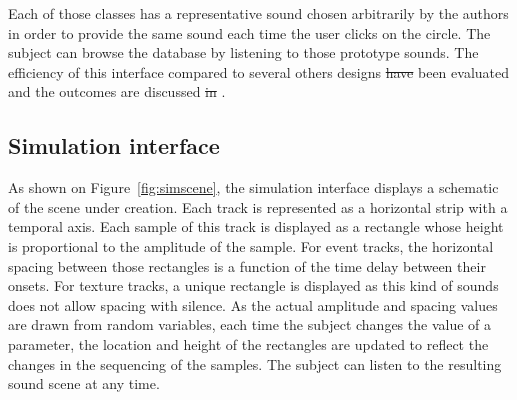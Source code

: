 \documentclass[12pt]{elsarticle}
\newcommand{\cf}{cf.}
\providecommand{\DIFadd}[1]{{\protect\color{blue}\uwave{#1}}} %
\providecommand{\DIFdel}[1]{{\protect\color{red}\sout{#1}}}                      %
\providecommand{\DIFaddbegin}{} %
\providecommand{\DIFaddend}{} %
\providecommand{\DIFdelbegin}{} %
\providecommand{\DIFdelend}{} %
\begin{document}

Each of those classes has a representative sound chosen arbitrarily by the authors in order to provide the same sound each time the user clicks on the circle. The subject can browse the database by listening to those prototype sounds. The efficiency of this interface compared to several others designs \DIFdelbegin \DIFdel{have }\DIFdelend \DIFaddbegin \DIFadd{has }\DIFaddend been evaluated and the outcomes are discussed \DIFdelbegin \DIFdel{in }\DIFdelend \DIFaddbegin \DIFadd{by~}\DIFaddend \cite{lafay2016JAES}.

\subsection{Simulation interface}


As shown on Figure~\ref{fig:simscene}, the simulation interface displays a schematic of the scene under creation. Each track is represented as a horizontal strip with a temporal axis. Each sample of this track is displayed as a rectangle whose height is proportional to the amplitude of the sample. For event tracks, the horizontal spacing between those rectangles is a function of the time delay between their onsets. For texture tracks, a unique rectangle is displayed as this kind of sounds does not allow spacing with silence. As the actual amplitude and spacing values are drawn from random variables, each time the subject changes the value of a parameter, the location and height of the rectangles are updated to reflect the changes in the sequencing of the samples. The subject can listen to the resulting sound scene at any time.
\end{document}
